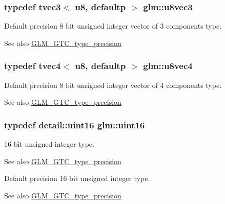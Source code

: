 \subsubsection[{u8vec3}]{\setlength{\rightskip}{0pt plus 5cm}typedef tvec3$<$ u8, defaultp $>$ {\bf glm\+::u8vec3}}\label{group__gtc__type__precision_ga8262aeb120701de1b57773eb10be0f35}
Default precision 8 bit unsigned integer vector of 3 components type. \begin{DoxySeeAlso}{See also}
\hyperlink{group__gtc__type__precision}{G\+L\+M\+\_\+\+G\+T\+C\+\_\+type\+\_\+precision} 
\end{DoxySeeAlso}
\hypertarget{group__gtc__type__precision_gaf3c840b8a90a194559121504ba599197}{}
\subsubsection[{u8vec4}]{\setlength{\rightskip}{0pt plus 5cm}typedef tvec4$<$ u8, defaultp $>$ {\bf glm\+::u8vec4}}\label{group__gtc__type__precision_gaf3c840b8a90a194559121504ba599197}
Default precision 8 bit unsigned integer vector of 4 components type. \begin{DoxySeeAlso}{See also}
\hyperlink{group__gtc__type__precision}{G\+L\+M\+\_\+\+G\+T\+C\+\_\+type\+\_\+precision} 
\end{DoxySeeAlso}
\hypertarget{group__gtc__type__precision_gad8c2939e1fdd8e5828b31d95c52255d5}{}
\subsubsection[{uint16}]{\setlength{\rightskip}{0pt plus 5cm}typedef detail\+::uint16 {\bf glm\+::uint16}}\label{group__gtc__type__precision_gad8c2939e1fdd8e5828b31d95c52255d5}
16 bit unsigned integer type. \begin{DoxySeeAlso}{See also}
\hyperlink{group__gtc__type__precision}{G\+L\+M\+\_\+\+G\+T\+C\+\_\+type\+\_\+precision}
\end{DoxySeeAlso}
Default precision 16 bit unsigned integer type. \begin{DoxySeeAlso}{See also}
\hyperlink{group__gtc__type__precision}{G\+L\+M\+\_\+\+G\+T\+C\+\_\+type\+\_\+precision} 
\end{DoxySeeAlso}
\hypertarget{group__gtc__type__precision_gac4eb4f43cae8129b00086dc234d3b8fc}{}
